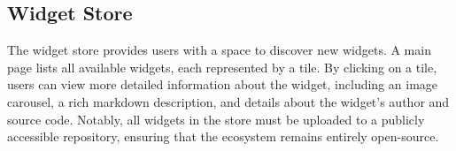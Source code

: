 \subsection{Widget Store}
The widget store provides users with a space to discover new widgets. A main page lists all available widgets, each represented by a tile. By clicking on a tile, users can view more detailed information about the widget, including an image carousel, a rich markdown description, and details about the widget’s author and source code. Notably, all widgets in the store must be uploaded to a publicly accessible repository, ensuring that the ecosystem remains entirely open-source.

\begin{figure}[h]
    \centering
    \begin{minipage}[b]{0.32\textwidth}
        \centering

\end{minipage}
\end{figure}
